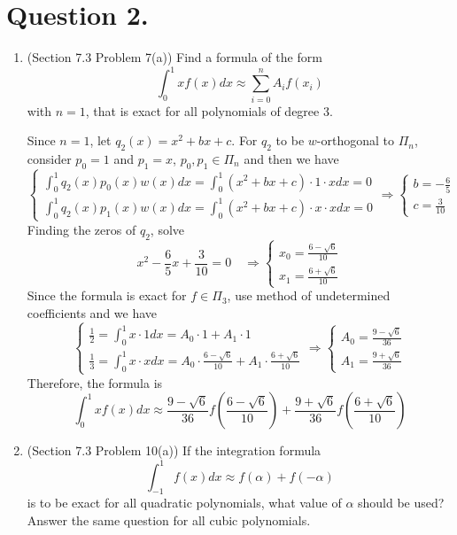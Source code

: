 \documentclass[10pt]{report}
\newcommand{\dintt}[4] {\int_{#1}^{#2} #3 d#4}
\begin{document}
\section*{Question 2.}
\begin{enumerate}
	\item 
	(Section 7.3 Problem 7(a)) Find a formula of the form
	\[
	\dintt{0}{1}{xf(x)}{x} \approx \sum_{i=0}^{n} A_i f(x_i)
	\]
	with $n=1$, that is exact for all polynomials of degree 3.
	
	Since $n=1$, let $q_2(x) = x^2 + bx + c$. For $q_2$ to be $w$-orthogonal to $\Pi_n$, consider $p_0 = 1$ and $p_1 = x$, $p_0, p_1 \in \Pi_n$ and then we have
	\[
	\begin{cases}
	\dintt{0}{1}{q_2(x)p_0(x)w(x)}{x} = \dintt{0}{1}{(x^2 + bx + c)\cdot 1\cdot x}{x} = 0\\[1em]
	\dintt{0}{1}{q_2(x)p_1(x)w(x)}{x} = \dintt{0}{1}{(x^2 + bx + c)\cdot x\cdot x}{x} = 0
	\end{cases}
	\Rightarrow
	\begin{cases}
	b = -\frac{6}{5}\\[1em]
	c = \frac{3}{10}
	\end{cases}
	\]
	Finding the zeros of $q_2$, solve
	\[
	x^2 - \frac{6}{5}x + \frac{3}{10} = 0
	\quad\Rightarrow
	\begin{cases}
	x_0 = \frac{6-\sqrt{6}}{10}\\[1em]
	x_1 = \frac{6+\sqrt{6}}{10}
	\end{cases}
	\]
	Since the formula is exact for $f\in \Pi_3$, use method of undetermined coefficients and we have
	\[
	\begin{cases}
	\frac{1}{2} = \dintt{0}{1}{x\cdot 1}{x} = A_0\cdot 1 + A_1\cdot 1\\[1em]
	\frac{1}{3} = \dintt{0}{1}{x\cdot x}{x} = A_0\cdot \frac{6-\sqrt{6}}{10} + A_1\cdot \frac{6+\sqrt{6}}{10}
	\end{cases}
	\Rightarrow
	\begin{cases}
	A_0 = \frac{9-\sqrt{6}}{36}\\[1em]
	A_1 = \frac{9+\sqrt{6}}{36}
	\end{cases}
	\]
	Therefore, the formula is
	\[
	\dintt{0}{1}{xf(x)}{x} \approx \frac{9-\sqrt{6}}{36}f\left(\frac{6-\sqrt{6}}{10}\right) + \frac{9+\sqrt{6}}{36}f\left(\frac{6+\sqrt{6}}{10}\right)
	\]
	
	\item 
	(Section 7.3 Problem 10(a)) If the integration formula
	\[
	\dintt{-1}{1}{f(x)}{x} \approx f(\alpha) + f(-\alpha)
	\]
	is to be exact for all quadratic polynomials, what value of $\alpha$ should be used? Answer the same question for all cubic polynomials.
	

\end{enumerate}
\end{document}
